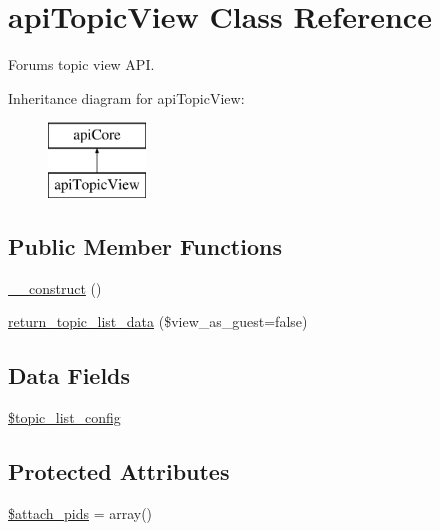 \hypertarget{classapi_topic_view}{\section{api\-Topic\-View Class Reference}
\label{classapi_topic_view}
}


Forums topic view A\-P\-I.  


Inheritance diagram for api\-Topic\-View\-:\begin{figure}[H]
\begin{center}
\leavevmode
\includegraphics[height=2.000000cm]{classapi_topic_view}
\end{center}
\end{figure}
\subsection*{Public Member Functions}
\begin{DoxyCompactItemize}
\item 
\hyperlink{classapi_topic_view_a095c5d389db211932136b53f25f39685}{\-\_\-\-\_\-construct} ()
\item 
\hyperlink{classapi_topic_view_a718ee6e71e32df74e37a93568daf2639}{return\-\_\-topic\-\_\-list\-\_\-data} (\$view\-\_\-as\-\_\-guest=false)
\end{DoxyCompactItemize}
\subsection*{Data Fields}
\begin{DoxyCompactItemize}
\item 
\hyperlink{classapi_topic_view_af9d44ca8823257cb2c86a82d193c8b68}{\$topic\-\_\-list\-\_\-config}
\end{DoxyCompactItemize}
\subsection*{Protected Attributes}
\begin{DoxyCompactItemize}
\item 
\hyperlink{classapi_topic_view_a5934d8cb70f1818c80b753b23354f3b6}{\$attach\-\_\-pids} = array()
\end{DoxyCompactItemize}


